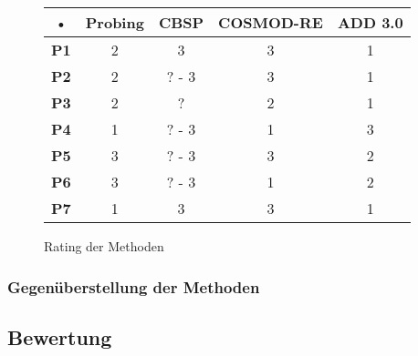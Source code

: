 \begin{figure}[h] %
\caption{Rating der Methoden}
\centering
\begin{tabular}{|c|c|c|c|c|}
\hline 
\rule[-1ex]{0pt}{2.5ex} • & \textbf{Probing} & \textbf{CBSP} & \textbf{COSMOD-RE} & \textbf{ADD 3.0} \\ 
\hline 
\rule[-1ex]{0pt}{2.5ex} \textbf{P1} & 2 & 3 & 3 & 1 \\ 
\hline 
\rule[-1ex]{0pt}{2.5ex} \textbf{P2} & 2 & ? - 3 & 3 & 1 \\ 
\hline 
\rule[-1ex]{0pt}{2.5ex} \textbf{P3} & 2 & ? & 2 & 1 \\ 
\hline 
\rule[-1ex]{0pt}{2.5ex} \textbf{P4} & 1 & ? - 3 & 1 & 3 \\ 
\hline 
\rule[-1ex]{0pt}{2.5ex} \textbf{P5} & 3 & ? - 3 & 3 & 2 \\ 
\hline 
\rule[-1ex]{0pt}{2.5ex} \textbf{P6} & 3 & ? - 3 & 1 & 2 \\ 
\hline 
\rule[-1ex]{0pt}{2.5ex} \textbf{P7} & 1 & 3 & 3 & 1 \\ 
\hline 
\end{tabular} 
\label{tab:method_rating}
\end{figure}






\subsubsection{Gegenüberstellung der Methoden}





\subsection{Bewertung}